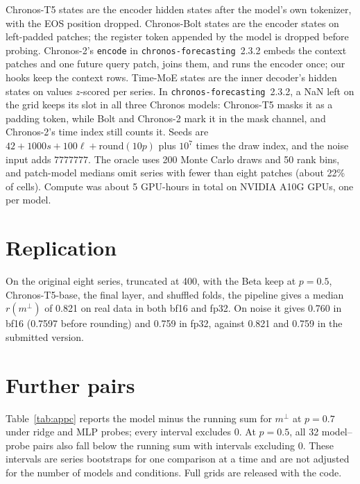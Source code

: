 \documentclass{article}
\newcommand{\mperp}{m^{\perp}}
\begin{document}
Chronos-T5 states are the encoder hidden states after the model's own tokenizer, with the EOS position dropped.
Chronos-Bolt states are the encoder states on left-padded patches; the register token appended by the model is dropped before probing.
Chronos-2's \texttt{encode} in \texttt{chronos-forecasting}~2.3.2 embeds the context patches and one future query patch, joins them, and runs the encoder once; our hooks keep the context rows.
Time-MoE states are the inner decoder's hidden states on values $z$-scored per series.
In \texttt{chronos-forecasting}~2.3.2, a NaN left on the grid keeps its slot in all three Chronos models: Chronos-T5 masks it as a padding token, while Bolt and Chronos-2 mark it in the mask channel, and Chronos-2's time index still counts it.
Seeds are $42 + 1000s + 100\ell + \mathrm{round}(10p)$ plus $10^{7}$ times the draw index, and the noise input adds $7777777$.
The oracle uses 200 Monte Carlo draws and 50 rank bins, and patch-model medians omit series with fewer than eight patches (about 22\% of cells).
Compute was about 5 GPU-hours in total on NVIDIA A10G GPUs, one per model.

\section{Replication}
\label{app:replication}

On the original eight series, truncated at 400, with the Beta keep at $p = 0.5$, Chronos-T5-base, the final layer, and shuffled folds, the pipeline gives a median $r(\mperp)$ of 0.821 on real data in both bf16 and fp32.
On noise it gives 0.760 in bf16 (0.7597 before rounding) and 0.759 in fp32, against 0.821 and 0.759 in the submitted version.

\section{Further pairs}
\label{app:pairs}

Table~\ref{tab:appc} reports the model minus the running sum for $\mperp$ at $p = 0.7$ under ridge and MLP probes; every interval excludes 0.
At $p = 0.5$, all 32 model--probe pairs also fall below the running sum with intervals excluding 0.
These intervals are series bootstraps for one comparison at a time and are not adjusted for the number of models and conditions.
Full grids are released with the code.
\end{document}
